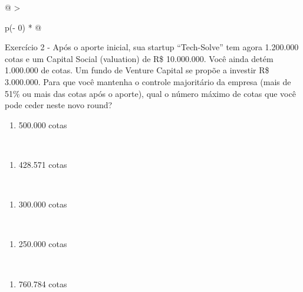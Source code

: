 \documentclass[
]{book}
\providecommand{\tightlist}{%
  \setlength{\itemsep}{0pt}\setlength{\parskip}{0pt}}
\begin{document}
\begin{longtable}[]{@{}
  >{\raggedright\arraybackslash}p{(\columnwidth - 0\tabcolsep) * }@{}}
\toprule\noalign{}
\endhead
\bottomrule\noalign{}
\endlastfoot
Exercício 2 - Após o aporte inicial, sua startup ``Tech-Solve'' tem agora 1.200.000 cotas e um Capital Social (valuation) de R\$ 10.000.000. Você ainda detém 1.000.000 de cotas. Um fundo de Venture Capital se propõe a investir R\$ 3.000.000. Para que você mantenha o controle majoritário da empresa (mais de 51\% ou mais das cotas após o aporte), qual o número máximo de cotas que você pode ceder neste novo round? \\
\begin{minipage}[t]{\linewidth}\raggedright
\begin{enumerate}
\def\labelenumi{\alph{enumi})}
\tightlist
\item
  500.000 cotas
\end{enumerate}
\end{minipage} \\
\begin{minipage}[t]{\linewidth}\raggedright
\begin{enumerate}
\def\labelenumi{\alph{enumi})}
\setcounter{enumi}{1}
\tightlist
\item
  428.571 cotas
\end{enumerate}
\end{minipage} \\
\begin{minipage}[t]{\linewidth}\raggedright
\begin{enumerate}
\def\labelenumi{\alph{enumi})}
\setcounter{enumi}{2}
\tightlist
\item
  300.000 cotas
\end{enumerate}
\end{minipage} \\
\begin{minipage}[t]{\linewidth}\raggedright
\begin{enumerate}
\def\labelenumi{\alph{enumi})}
\setcounter{enumi}{3}
\tightlist
\item
  250.000 cotas
\end{enumerate}
\end{minipage} \\
\begin{minipage}[t]{\linewidth}\raggedright
\begin{enumerate}
\def\labelenumi{\alph{enumi})}
\setcounter{enumi}{4}
\tightlist
\item
  760.784 cotas
\end{enumerate}
\end{minipage} \\
\end{longtable}
\end{document}
